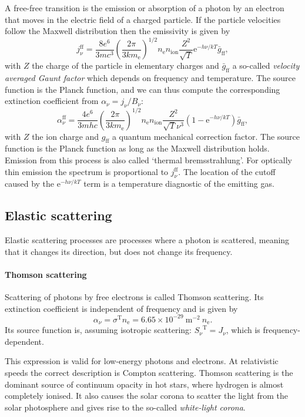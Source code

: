 \documentclass[12pt]{article}
\numberwithin{equation}{section}
\def\exp{\mathrm{e}}
\def\jnu{\ensuremath{j_{\nu}}}
\def\Jnu{\ensuremath{J_{\nu}}}
\def\Bnu{\ensuremath{B_{\nu}}}
\def\Snu{\ensuremath{S_{\nu}}}
\def\anu{\ensuremath{\alpha_{\nu}}}
\def\nelec{\ensuremath{n_\mathrm{e}}}
\newcommand{\be}{\begin{equation}}
\newcommand{\ee}{\end{equation}}
\def\me{\ensuremath{m_\mathrm{e}}}
\begin{document}
A free-free transition is the emission or absorption of a photon by an electron that moves in the electric field of a charged particle. If the particle velocities follow the Maxwell distribution then the emissivity is given by
\be
j^\mathrm{ff}_\nu = \frac{8e^6}{3 m c^3} \left( \frac{2 \pi}{3 k \me}\right)^{1/2} \nelec n_\mathrm{ion} \frac{Z^2}{\sqrt{T} } \exp^{-h \nu /kT} \bar{g}_\mathrm{ff},
\ee
with $Z$ the charge of the particle in elementary charges and $\bar{g}_\mathrm{ff}$ a so-called {\it velocity averaged Gaunt factor} which depends on frequency and temperature. The source function is the Planck function, and we can thus compute the corresponding extinction coefficient from $\anu= \jnu/\Bnu$:
\be
\alpha^\mathrm{ff}_\nu = \frac{4e^6}{3mhc} \left( \frac{2 \pi}{3 k \me}\right)^{1/2}  \nelec n_\mathrm{ion} \frac{Z^2}{\sqrt{T} \nu^3} (1-\exp^{-h \nu /kT}) \bar{g}_\mathrm{ff},
\ee
with $Z$ the ion charge and $g_\mathrm{ff}$ a quantum mechanical correction factor. The source function is the Planck function as long as the Maxwell distribution holds. Emission from this process is also called `thermal bremsstrahlung'. For optically thin emission the spectrum is proportional to $j^\mathrm{ff}_\nu$. The location of the cutoff caused by the $\exp^{-h \nu /kT}$ term is a temperature diagnostic of the emitting gas.

\subsection{Elastic scattering}

Elastic scattering processes are processes where a photon is scattered, meaning that it changes its direction, but does not change its frequency.

\paragraph{Thomson scattering} Scattering of photons by free electrons is called Thomson scattering. Its extinction coefficient is independent of frequency and is given by
\be
\anu = \sigma^\mathrm{T} \nelec = 6.65 \times 10^{-29}\ \mathrm{m}^{-2} \  \nelec.
\ee
Its source function is, assuming isotropic scattering: $\Snu^\mathrm{T} = \Jnu$, which is frequency-dependent.

This expression is valid for low-energy photons and electrons.  At relativistic speeds the correct description is Compton scattering. Thomson scattering is the dominant source of continuum opacity in hot stars, where hydrogen is almost completely ionised. It also causes the solar corona to scatter the light from the solar photosphere and gives rise to the so-called {\it white-light corona}.
\end{document}
